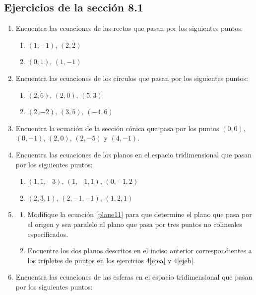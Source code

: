 \subsection*{Ejercicios de la sección 8.1}

\begin{enumerate}
    \item Encuentra las ecuaciones de las rectas que pasan por los siguientes puntos:
    \begin{enumerate}[label=\alph*)]
        \item $(1, -1)$, $(2, 2)$
        \item $(0, 1)$, $(1, -1)$
    \end{enumerate}
    \item Encuentra las ecuaciones de los círculos que pasan por los siguientes puntos:
    \begin{enumerate}[label=\alph*)]
        \item $(2, 6)$, $(2, 0)$, $(5, 3)$
        \item $(2, -2)$, $(3, 5)$, $(-4, 6)$
    \end{enumerate}
    \item Encuentra la ecuación de la sección cónica que pasa por los puntos $(0, 0)$, $(0, -1)$, $(2, 0)$, $(2, -5)$ y $(4, -1)$.
    \item Encuentra las ecuaciones de los planos en el espacio tridimensional que pasan por los siguientes puntos:
    \begin{enumerate}[label=\alph*)]
        \item $(1, 1, -3)$, $(1, -1, 1)$, $(0, -1, 2)$\label{ejea}
        \item $(2, 3, 1)$, $(2, -1, -1)$, $(1, 2, 1)$\label{ejeb}
    \end{enumerate}
    \item \begin{enumerate}[label=\alph*)]
        \item Modifique la ecuación \eqref{plane11} para que determine el plano que pasa por el origen y sea paralelo al plano que pasa por tres puntos no colineales especificados.
        \item Encuentre los dos planos descritos en el inciso anterior correspondientes a los tripletes de puntos en los ejercicios 4\ref{ejea} y 4\ref{ejeb}.
    \end{enumerate}
    \item Encuentra las ecuaciones de las esferas en el espacio tridimensional que pasan por los siguientes puntos:
    \begin{enumerate}[label=\alph*)]

\end{enumerate}
\end{enumerate}
